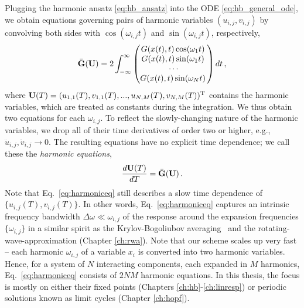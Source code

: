 Plugging the harmonic ansatz \eqref{eq:hb_ansatz} into the ODE \eqref{eq:hb_general_ode}, we obtain equations governing pairs of harmonic variables $(u_{i,j}, v_{i,j})$ by convolving both sides with $\cos(\omega_{i,j} t)$ and $\sin(\omega_{i,j} t)$, respectively,
\begin{equation} \label{eq:hb_int}
\bar{\vb{G}}(\vb{U}) = 2 \int_{-\infty}^{\infty} \mqty( G(x(t),t) \cos(\omega_{1} t) \,
\\  G(x(t),t) \sin(\omega_{1} t) \,
\\ \cdots 
\\ G(x(t),t) \sin(\omega_{N} t) \,) \, dt \,,
\end{equation}
where $\vb{U}(T) = (u_{1,1}(T), v_{1,1}(T), ...,u_{N,M}(T), v_{N,M}(T))^{\text T}$ contains the harmonic variables, which are treated as constants during the integration.
We thus obtain two equations for each $\omega_{i,j}$. To reflect the slowly-changing nature of the harmonic variables, we drop all of their time derivatives of order two or higher, e.g., $\ddot{u}_{i,j}, \ddot{v}_{i,j}\rightarrow 0$. The resulting equations have no explicit time dependence; we call these the \textit{harmonic equations},
%
\begin{equation} \label{eq:harmoniceq}
\frac{d\vb{U}(T)}{dT}  = \bar{\vb{G}} (\vb{U})\,.
\end{equation}
%
Note that Eq.~\eqref{eq:harmoniceq} still describes a slow time dependence of $\{u_{i,j}(T), v_{i,j}(T)\}$. In other words, Eq.~\eqref{eq:harmoniceq} captures an intrinsic frequency bandwidth $\Delta\omega \ll \omega_{i,j}$ of the response around the expansion frequencies $\{\omega_{i,j}\}$  in a similar spirit as the Krylov-Bogoliubov averaging~\cite{Nayfeh_2008,Leuch_2016} and the rotating-wave-approximation (Chapter \ref{ch:rwa}). Note that our scheme scales up very fast -- each harmonic $\omega_{i,j}$ of a variable $x_i$ is converted into two harmonic variables. Hence, for a system of $N$ interacting components, each expanded in $M$ harmonics, Eq.~\eqref{eq:harmoniceq} consists of $2 N M$ harmonic equations. In this thesis, the focus is mostly on either their fixed points (Chapters \ref{ch:hb}-\ref{ch:linresp}) or periodic solutions known as limit cycles (Chapter \ref{ch:hopf}). 


